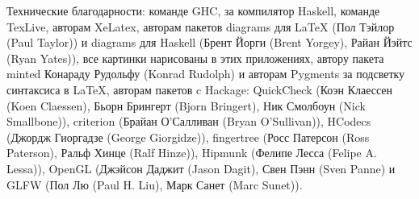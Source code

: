 Технические благодарности: команде GHC, за компилятор Haskell,
команде TexLive, авторам XeLatex, авторам пакетов diagrams
для LaTeX (Пол Тэйлор (Paul Taylor)) и diagrams для Haskell 
(Брент Йорги (Brent Yorgey), Райан Йэйтс (Ryan Yates)), все 
картинки нарисованы в этих приложениях, автору
пакета minted Конараду Рудольфу (Konrad Rudolph) и авторам
Pygments за подсветку синтаксиса в LaTeX, авторам пакетов
c Hackage:
QuickCheck (Коэн Клаессен (Koen Claessen), Бьорн Брингерт (Bjorn Bringert),
Ник Смолбоун (Nick Smallbone)), 
criterion (Брайан О'Салливан (Bryan O'Sullivan)), 
HCodecs (Джордж Гиоргадзе (George Giorgidze)), 
fingertree (Росс Патерсон (Ross Paterson), Ральф Хинце (Ralf Hinze)), Hipmunk 
(Фелипе Лесса (Felipe A. Lessa)), OpenGL (Джэйсон Даджит (Jason Dagit),
Свен Пэнн (Sven Panne) и GLFW (Пол Лю (Paul H. Liu), Марк Санет (Marc Sunet)).






